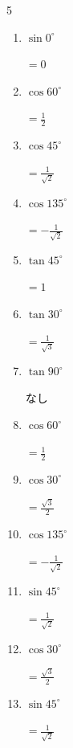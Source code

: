 \begin{multicols}{5}
\begin{enumerate}
  \item $\displaystyle \sin{0^\circ}$

        $\displaystyle =0$

  \item $\displaystyle \cos{60^\circ}$

        $\displaystyle =\frac{1}{2}$

\columnbreak %

  \item $\displaystyle \cos{45^\circ}$

        $\displaystyle =\frac{1}{\sqrt{2}}$

  \item $\displaystyle \cos{135^\circ}$

        $\displaystyle =-\frac{1}{\sqrt{2}}$

  \item $\displaystyle \tan{45^\circ}$

        $\displaystyle =1$

  \item $\displaystyle \tan{30^\circ}$

        $\displaystyle =\frac{1}{\sqrt{3}}$

  \item $\displaystyle \tan{90^\circ}$

        $\displaystyle なし$

  \item $\displaystyle \cos{60^\circ}$

        $\displaystyle =\frac{1}{2}$

  \item $\displaystyle \cos{30^\circ}$

        $\displaystyle =\frac{\sqrt{3}}{2}$

  \item $\displaystyle \cos{135^\circ}$

        $\displaystyle =-\frac{1}{\sqrt{2}}$

  \item $\displaystyle \sin{45^\circ}$

        $\displaystyle =\frac{1}{\sqrt{2}}$

  \item $\displaystyle \cos{30^\circ}$

        $\displaystyle =\frac{\sqrt{3}}{2}$

  \item $\displaystyle \sin{45^\circ}$

        $\displaystyle =\frac{1}{\sqrt{2}}$


\end{enumerate}
\end{multicols}
